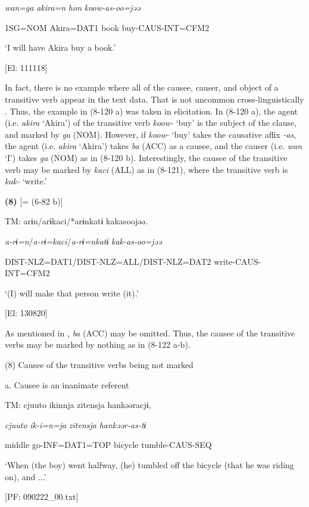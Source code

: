     \textit{wan=ga}  \textit{akira=n}  \textit{hon}  \textit{koow-as{}-oo=jəə}

    1SG=NOM  Akira=DAT1  book  buy-CAUS-INT=CFM2

    ‘I will have Akira buy a book.’

    [El: 111118]

In fact, there is no example where all of the causee, causer, and object of a transitive verb appear in the text data. That is not uncommon cross-linguistically \citep[79]{Dryer2007}. Thus, the example in (8-120 a) was taken in elicitation. In (8-120 a), the agent (i.e. \textit{akira} ‘Akira’) of the transitive verb \textit{koow-} ‘buy’ is the subject of the clause, and marked by \textit{ga} (NOM). However, if \textit{koow-} ‘buy’ takes the causative affix \textit{{}-as}, the agent (i.e. \textit{akira} ‘Akira’) takes \textit{ba} (ACC) as a causee, and the causer (i.e. \textit{wan} ‘I’) takes \textit{ga} (NOM) as in (8-120 b). Interestingly, the causee of the transitive verb may be marked by \textit{kaci} (ALL) as in (8-121), where the transitive verb is \textit{kak-} ‘write.’

\textbf{(8)}  [= (6-82 b)]

  TM:  arɨn/arɨkaci/*arɨnkatɨ  kakasoojəə.

    \textit{a-rɨ=n}/\textit{a-rɨ=kaci}/\textit{a-rɨ=nkatɨ}  \textit{kak-as{}-oo=jəə}

    DIST-NLZ=DAT1/DIST-NLZ=ALL/DIST-NLZ=DAT2  write-CAUS-INT=CFM2

    ‘(I) will make that person write (it).’

    [El: 130820]

  As mentioned in , \textit{ba} (ACC) may be omitted. Thus, the causee of the transitive verbs may be marked by nothing as in (8-122 a-b).

(8)  Causee of the transitive verbs being not marked

  a. Causee is an inanimate referent

  TM:  cjuuto  ikinnja  {\textbar}zitensja{\textbar}  hankəəracjɨ,

    \textit{cjuuto}  \textit{ik-i=n=ja}  \textit{zitensja}  \textit{hankəər-as{}-tɨ}

    middle  go-INF=DAT1=TOP  bicycle  tumble-CAUS-SEQ

    ‘When (the boy) went halfway, (he) tumbled off the bicycle (that he was riding on), and ...’

    [PF: 090222\_00.txt]

